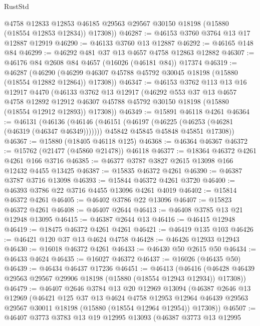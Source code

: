 \begin{lexlean}{RustStd}
\begin{coremodule}
        @4758
        @12833
        @12853
        @46185
        @29563
        @29567
        @30150
        @18198
        (@15880 (@18554 @12853 @12834))
        @17308))
@46287 := @46153 @3760 @3764 @13 @17 @12887 @12919
@46290 := @46133 @3760 @13 @12887
@46292 := @46165 @148 @84
@46299 := @46292 @481 @37 @13 @4657 @4758 @12863 @12882
@46307 := @46176 @84 @2608 @84 @4657 (@16026 (@46181 @84)) @17374
@46319 := @46287
    (@46290 (@46299 @46307 @45788 @45792 @30045 @18198 (@15880 (@18554 @12882 @12864)) @17308))
@46347 := @46153
    @3762
    @113
    @13
    @16
    @12917
    @4470
    (@46133
      @3762
      @13
      @12917
      (@46292
        @553
        @37
        @13
        @4657
        @4758
        @12892
        @12912
        @46307
        @45788
        @45792
        @30150
        @18198
        (@15880 (@18554 @12912 @12893))
        @17308))
@46349 := @15891 @46118 @4261
@46364 := @46131
    (@46136
      (@46146
        (@46151 (@46197 (@46225 (@46253 (@46281 (@46319 (@46347 @46349)))))))
        @45842
        @45845
        @45848
        @45851
        @17308))
@46367 := @15880 (@18405 @46118 @125)
@46368 := @46364 @46367
@46372 := @15762 (@21477 (@45860 @21478)) @46118
@46377 := @18364 @46372 @4261 @4261 @166 @3716
@46385 := @46377 @3787 @3827 @2615 @13098 @166 @12432 @4455 @13425
@46387 := @15835 @46372 @4261
@46390 := @46387 @3787 @3716 @13098
@46393 := @15844 @46372 @4261 @3720
@46400 := @46393 @3786 @22 @3716 @4455 @13096 @4261 @4019
@46402 := @15814 @46372 @4261
@46405 := @46402 @3786 @22 @13096
@46407 := @15823 @46372 @4261
@46408 := @46407 @2644
@46413 := @46408 @3785 @13 @21 @12948 @13095
@46415 := @46387 @2644 @13
@46416 := @46415 @12948
@46419 := @18475 @46372 @4261 @4261
@46421 := @46419 @135 @103
@46426 := @46421 @120 @37 @13 @4624 @4758
@46428 := @46426 @12933 @12943
@46430 := @16018 @46372 @4261
@46433 := @46430 @50 @2615 @50
@46434 := @46433 @4624
@46435 := @16027 @46372
@46437 := @16026 (@46435 @50)
@46439 := @46434 @46437 @17236
@46451 := @46413
    (@46416 (@46428 @46439 @29563 @29567 @29906 @18198 (@15880 (@18554 @12943 @12934)) @17308))
@46479 := @46407
    @2646
    @3784
    @13
    @20
    @12969
    @13094
    (@46387
      @2646
      @13
      @12969
      (@46421
        @125
        @37
        @13
        @4624
        @4758
        @12953
        @12964
        @46439
        @29563
        @29567
        @30011
        @18198
        (@15880 (@18554 @12964 @12954))
        @17308))
@46507 := @46407
    @3773
    @3783
    @13
    @19
    @12995
    @13093
    (@46387
      @3773
      @13
      @12995

\end{coremodule}
\end{lexlean}
